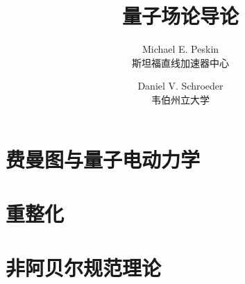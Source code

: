 \documentclass[11pt,oneside]{ctexbook}
\title{\bfseries 量子场论导论}
\author{Michael E. Peskin\\ 斯坦福直线加速器中心
        \and Daniel V. Schroeder\\ 韦伯州立大学}
\date{}
\numberwithin{equation}{chapter}
\begin{document}
\frontmatter
\maketitle

\tableofcontents



\mainmatter

\part{费曼图与量子电动力学}








\part{重整化}







\part{非阿贝尔规范理论}










\appendix

\end{document}

